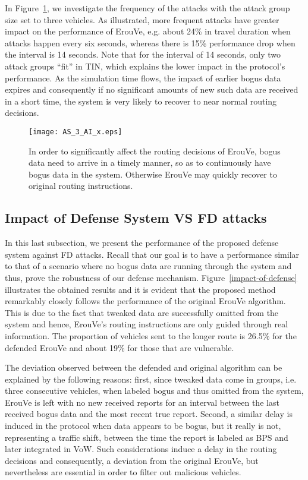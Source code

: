 \documentclass[conference]{IEEEtran}
\begin{document}
In  Figure~\ref{att-inter}, we investigate the frequency of the attacks with the attack group size set to three vehicles. As illustrated, more frequent attacks have greater impact on the performance of ErouVe, e.g. about 24\% in travel duration when attacks happen every six seconds, whereas there is 15\% performance drop when the interval is 14 seconds. Note that for the interval of 14 seconds, only two attack groups ``fit'' in TIN, which explains the lower impact in the protocol's performance. As the simulation time flows, the impact of
earlier bogus data expires and consequently if no significant amounts of new such data are received in a short time, the system is very likely to recover to near normal routing decisions. 


\begin{figure}[!htb]
  \centering
     \texttt{[image: AS\_3\_AI\_x.eps]}
  \caption{In order to significantly affect the routing decisions of ErouVe, bogus data need to arrive in a timely manner, so as to continuously have bogus data in the system. Otherwise ErouVe may quickly recover to original routing instructions.}
  \label{att-inter}
\end{figure}



\subsection{Impact of Defense System VS FD attacks}

In this last subsection, we present the performance of the proposed defense system against FD attacks. Recall that our goal is to have a performance similar to that of a scenario where no bogus data are running through the system and thus, prove the robustness of our defense mechanism.  Figure~\ref{impact-of-defense} illustrates the obtained results and it is evident
that the proposed method remarkably closely follows the performance of the original ErouVe algorithm. This is due to the fact that tweaked data are successfully omitted from the system and hence, ErouVe's routing instructions are only guided through real information.
The proportion of vehicles sent to the longer route is 26.5\% for the defended ErouVe and about 19\% for those that are vulnerable. 

The deviation observed between the defended and original algorithm can be explained by the following reasons: first, since tweaked data come in groups, i.e. three consecutive vehicles, when labeled bogus and thus omitted from the system, ErouVe is left with no new received reports for an interval between the last received bogus data and the most recent true report.  Second, a similar delay is induced in the protocol when data appears to be bogus, but it really is not, representing a traffic shift, between the time the report is labeled as BPS and later integrated in VoW. Such considerations induce a delay in the routing decisions and consequently, a deviation from the original ErouVe, but nevertheless are essential in order to filter out malicious vehicles.
\end{document}
